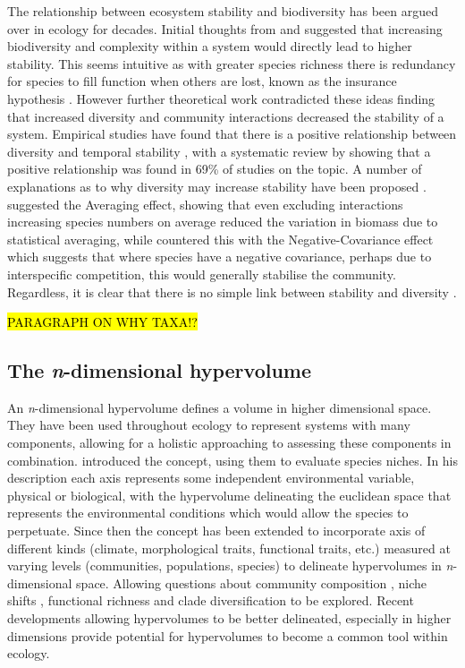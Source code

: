 The relationship between ecosystem stability and biodiversity has been argued over in ecology for decades. Initial thoughts from \cite{Elton1958} and \cite{MacArthur1955} suggested that increasing biodiversity and complexity within a system would directly lead to higher stability. This seems intuitive as with greater species richness there is redundancy for species to fill function when others are lost, known as the insurance hypothesis \citep{Yachi1999}. However further theoretical work contradicted these ideas \citep{May1973} finding that increased diversity and community interactions decreased the stability of a system. Empirical studies have found that there is a positive relationship between diversity and temporal stability \citep{Tilman1994, Tilman2006}, with a systematic review by \cite{Ives2007} showing that a positive relationship was found in 69\% of studies on the topic. A number of explanations as to why diversity may increase stability have been proposed \citep{McCann2000}. \cite{Doak1998} suggested the Averaging effect, showing that even excluding interactions increasing species numbers on average reduced the variation in biomass due to statistical averaging, while \cite{Tilman1998} countered this with the Negative-Covariance effect which suggests that where species have a negative covariance, perhaps due to interspecific competition, this would generally stabilise the community. Regardless, it is clear that there is no simple link between stability and diversity \citep{Goodman1975}.

\hl{PARAGRAPH ON WHY TAXA!?}

\subsection{The \emph{n}-dimensional hypervolume}

An \emph{n}-dimensional hypervolume defines a volume in higher dimensional space. They have been used throughout ecology to represent systems with many components, allowing for a holistic approaching to assessing these components in combination.  \cite{Hutchinson1957} introduced the concept, using them to evaluate species niches. In his description each axis represents some independent environmental variable, physical or biological, with the hypervolume delineating the euclidean space that represents the environmental conditions which would allow the species to perpetuate. Since then the concept has been extended to incorporate axis of different kinds (climate, morphological traits, functional traits, etc.) measured at varying levels (communities, populations, species) to delineate hypervolumes in \emph{n}-dimensional space. Allowing questions about community composition \citep{Barros2016}, niche shifts \citep{Tingley2014, Blonder2015, Jackson2000, Evans2009}, functional richness \citep{Lamanna2014} and clade diversification \citep{Sidlauskas2008} to be explored. Recent developments allowing hypervolumes to be better delineated, especially in higher dimensions \citep{Blonder2014, Blonder2017b, Junker2016} provide potential for hypervolumes to become a common tool within ecology.

